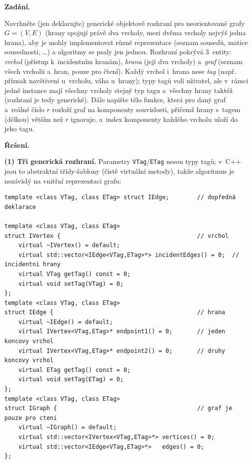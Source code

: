 \documentclass[11pt,a4paper]{article}
\begin{document}
\begin{priklad}
\par

\textbf{Zadání.}\par
Navrhněte (jen deklarujte) generické objektové rozhraní pro neorientované grafy
$G = (V, E)$ (hrany spojují právě dva vrcholy, mezi dvěma vrcholy nejvýš jedna
hrana), aby je mohly implementovat různé reprezentace (seznam sousedů, matice
sousednosti, \dots) a algoritmy se psaly jen jednou. Rozhraní pokrývá 3~entity:
\emph{vrchol} (přístup k~incidentním hranám), \emph{hrana} (její dva vrcholy)
a~\emph{graf} (seznam všech vrcholů a~hran, pouze pro čtení). Každý vrchol i~hrana
nese \emph{tag} (např. příznak navštívení u~vrcholu, váha u~hrany); typy tagů volí
uživatel, ale v~rámci jedné instance mají všechny vrcholy stejný typ tagu a~všechny
hrany taktéž (rozhraní je tedy generické). Dále napište tělo funkce, která pro daný
graf a~reálné číslo $r$ rozloží graf na komponenty souvislosti, přičemž hrany
s~tagem (délkou) větším než $r$ ignoruje, a~index komponenty každého vrcholu uloží
do jeho tagu.

\medskip
\textbf{Řešení.}\par
\textbf{(1) Tři generická rozhraní.} Parametry \texttt{VTag}/\texttt{ETag} nesou typy
tagů; v~C++ jsou to abstraktní třídy-šablony (čistě virtuální metody), takže algoritmus
je nezávislý na vnitřní reprezentaci grafu:

\begin{lstlisting}[style=cpp]
template <class VTag, class ETag> struct IEdge;        // dopředná deklarace

template <class VTag, class ETag>
struct IVertex {                                       // vrchol
    virtual ~IVertex() = default;
    virtual std::vector<IEdge<VTag,ETag>*> incidentEdges() = 0;  // incidentni hrany
    virtual VTag getTag() const = 0;
    virtual void setTag(VTag) = 0;
};
template <class VTag, class ETag>
struct IEdge {                                         // hrana
    virtual ~IEdge() = default;
    virtual IVertex<VTag,ETag>* endpoint1() = 0;       // jeden koncovy vrchol
    virtual IVertex<VTag,ETag>* endpoint2() = 0;       // druhy koncovy vrchol
    virtual ETag getTag() const = 0;
    virtual void setTag(ETag) = 0;
};
template <class VTag, class ETag>
struct IGraph {                                        // graf je pouze pro cteni
    virtual ~IGraph() = default;
    virtual std::vector<IVertex<VTag,ETag>*> vertices() = 0;
    virtual std::vector<IEdge<VTag,ETag>*>   edges() = 0;
};
\end{lstlisting}


\end{priklad}
\end{document}
